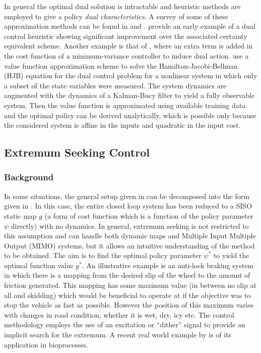 In general the optimal dual solution is intractable and heuristic methods are employed to give a policy \textit{dual characteristics}. A survey of some of these approximation methods can be found in \cite{Wit95} and \cite{Un00}. \cite{TB72} provide an early example of a dual control heuristic showing significant improvement over the associated certainty equivalent scheme. Another example is that of \cite{FK97}, where an extra term is added in the cost function of a minimum-variance controller to induce dual action. \cite{SCT08} use a value function approximation scheme to solve the Hamilton-Jacobi-Bellman (HJB) equation for the dual control problem for a nonlinear system in which only a subset of the state variables were measured. The system dynamics are augmented with the dynamics of a Kalman-Bucy filter to yield a fully observable system. Then the value function is approximated using available training data and the optimal policy can be derived analytically, which is possible only because the considered system is affine in the inputs and quadratic in the input cost.







\subsection{Extremum Seeking Control}
\subsubsection{Background}
In some situations, the general setup given in  can be decomposed into the form given in . In this case, the entire closed loop system has been reduced to a SISO static map $g$ (a form of cost function which is a function of the policy parameter $\psi$ directly) with no dynamics. In general, extremum seeking is not restricted to this assumption and can handle both dynamic maps and Multiple Input Multiple Output (MIMO) systems, but it allows an intuitive understanding of the method to be obtained. The aim is to find the optimal policy parameter $\psi^*$ to yield the optimal function value $g^*$.
%
An illustrative example is an anti-lock braking system in which there is a mapping from the desired slip of the wheel to the amount of friction generated. This mapping has some maximum value (in between no slip at all and skidding) which would be beneficial to operate at if the objective was to stop the vehicle as fast as possible. However the position of this maximum varies with changes in road condition, whether it is wet, dry, icy etc. The control methodology employs the use of an excitation or ``dither'' signal to provide an implicit search for the extremum. A recent real world example by \cite{BNTM09} is of its application in bioprocesses. 

